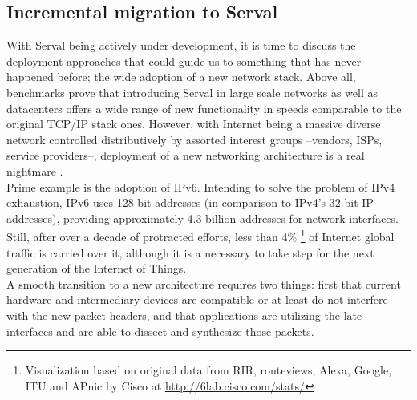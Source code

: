 \subsection{Incremental migration to Serval}
With Serval being actively under development, it is time to discuss the deployment approaches that could guide us to something that has never happened before; the wide adoption of a new network stack.
Above all, benchmarks prove that introducing Serval in large scale networks as well as datacenters offers a wide range of new functionality in speeds comparable to the original TCP/IP stack ones. However, with Internet being a massive diverse network controlled distributively by assorted interest groups --vendors, ISPs, service providers--, deployment of a new networking architecture is a real nightmare \cite{Podmayersky2011}.
\\ \indent Prime example is the adoption of IPv6. Intending to solve the problem of IPv4 exhaustion, IPv6 uses 128-bit addresses (in comparison to IPv4's 32-bit IP addresses), providing approximately 4.3 billion addresses for network interfaces. Still, after over a decade of protracted efforts, less than 4\% \footnote{Visualization based on original data from RIR, routeviews, Alexa, Google, ITU and APnic by Cisco at \url{http://6lab.cisco.com/stats/}} of Internet global traffic is carried over it, although it is a necessary to take step for the next generation of the Internet of Things. 
\\ \indent A smooth transition to a new architecture requires two things: first that current hardware and intermediary devices are compatible or at least do not interfere with the new packet headers, and that applications are utilizing the late interfaces and are able to dissect and synthesize those packets.

